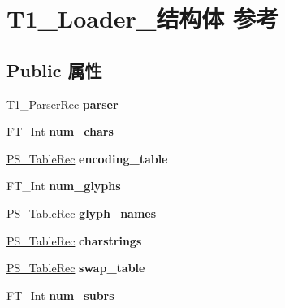 \hypertarget{struct_t1___loader__}{}\section{T1\+\_\+\+Loader\+\_\+结构体 参考}
\label{struct_t1___loader__}
\subsection*{Public 属性}
\begin{DoxyCompactItemize}
\item 
\mbox{\label{struct_t1___loader___aaeee4b6a6ec9ebb17751a6b399b080f8}} 
T1\+\_\+\+Parser\+Rec {\bfseries parser}
\item 
\mbox{\label{struct_t1___loader___a9504ee6d94ef38317bab6fe14eb83ffb}} 
F\+T\+\_\+\+Int {\bfseries num\+\_\+chars}
\item 
\mbox{\label{struct_t1___loader___a01b323c7f6f64fd5e615173eec9549cc}} 
\hyperlink{struct_p_s___table_rec__}{P\+S\+\_\+\+Table\+Rec} {\bfseries encoding\+\_\+table}
\item 
\mbox{\label{struct_t1___loader___a4a11a9719ba52683b6ffcfa770e256f6}} 
F\+T\+\_\+\+Int {\bfseries num\+\_\+glyphs}
\item 
\mbox{\label{struct_t1___loader___a7a5738470e28452a9c0d5ef852cd1c90}} 
\hyperlink{struct_p_s___table_rec__}{P\+S\+\_\+\+Table\+Rec} {\bfseries glyph\+\_\+names}
\item 
\mbox{\label{struct_t1___loader___ad98e85bd916225aed76e32c7068b7230}} 
\hyperlink{struct_p_s___table_rec__}{P\+S\+\_\+\+Table\+Rec} {\bfseries charstrings}
\item 
\mbox{\label{struct_t1___loader___a48f62b8c377bc70304e29a9ccd95eb36}} 
\hyperlink{struct_p_s___table_rec__}{P\+S\+\_\+\+Table\+Rec} {\bfseries swap\+\_\+table}
\item 
\mbox{\label{struct_t1___loader___a112eebfd6a91514675dd416cc96b047f}} 
F\+T\+\_\+\+Int {\bfseries num\+\_\+subrs}
\item 

\end{DoxyCompactItemize}
